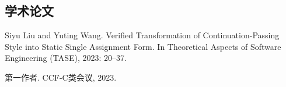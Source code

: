 
\begin{achievements}

\subsection*{学术论文}

\begin{bibliolist}{00}
  \item Siyu Liu and Yuting Wang. Verified Transformation of Continuation-Passing 
    Style into Static Single Assignment Form. 
    In Theoretical Aspects of Software Engineering (TASE), 2023: 20–37. 
\end{bibliolist}

\begin{bibliolist*}{00}
  \item 第一作者. CCF-C类会议, 2023.
\end{bibliolist*}

\end{achievements}
